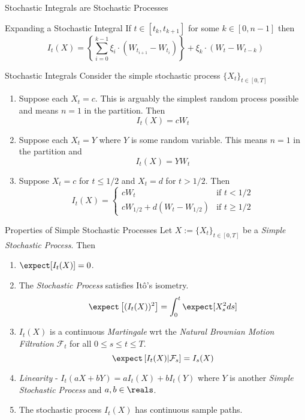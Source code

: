 \documentclass[11pt,a4paper]{article}
\begin{document}
  \begin{remark}{Stochastic Integrals are Stochastic Processes}

  \end{remark}

  \begin{remark}{Expanding a Stochastic Integral}
    If $t\in[t_k,t_{k+1}]$ for some $k\in[0,n-1]$ then
    \[ I_t(X)=\left\{\sum_{i=0}^{k-1}\xi_i\cdot(W_{t_{i+1}}-W_{t_i})\right\}+\xi_k\cdot(W_t-W_{t-k}) \]
  \end{remark}

  \begin{example}{Stochastic Integrals}
    Consider the simple stochastic process $\{X_t\}_{t\in[0,T]}$
    \begin{enumerate}
      \item Suppose each $X_t=c$. This is arguably the simplest random process possible and means $n=1$ in the partition. Then
      \[ I_t(X)=cW_t \]
      \item Suppose each $X_t=Y$ where $Y$ is some random variable. This means $n=1$ in the partition and
      \[ I_t(X)=YW_t \]
      \item Suppose $X_t=c$ for $t\leq1/2$ and $X_t=d$ for $t>1/2$. Then
      \[ I_t(X)=\begin{cases}cW_t&\text{if }t<1/2\\cW_{1/2}+d(W_t-W_{1/2})&\text{if }t\geq1/2\end{cases} \]
    \end{enumerate}
  \end{example}

  \begin{theorem}{Properties of Simple Stochastic Processes}\label{the_properties_of_simple_stochastic_processes}
    Let $X:=\{X_t\}_{t\in[0,T]}$ be a \textit{Simple Stochastic Process}. Then
    \begin{enumerate}
      \item $\expect[I_t(X)]=0$.
      \item The \textit{Stochastic Process} satisfies It\^o's isometry.
      \[ \expect\left[(I_t(X))^2\right]=\int_0^t\expect[X_s^2ds] \]
      \item $I_t(X)$ is a continuous \textit{Martingale} wrt the \textit{Natural Brownian Motion Filtration} $\mathcal{F}_t$ for all $0\leq s\leq t\leq T$.
      \[ \expect\left[I_t(X)|\mathcal{F}_s\right]=I_s(X) \]
      \item \textit{Linearity} - $I_t(aX+bY)=aI_t(X)+bI_t(Y)$ where $Y$ is another \textit{Simple Stochastic Process} and $a,b\in\reals$.
      \item The stochastic process $I_t(X)$ has continuous sample paths.
    \end{enumerate}
  \end{theorem}
\end{document}
